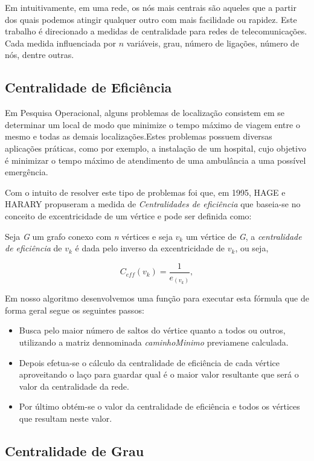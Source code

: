 \documentclass[12pt]{article}
\begin{document}
Em \cite{freitas} intuitivamente, em uma rede, os nós mais centrais são aqueles que a partir dos quais podemos atingir qualquer outro com mais facilidade ou rapidez.
Este trabalho é direcionado a medidas de centralidade para redes de telecomunicações.
Cada medida influenciada por $n$ variáveis, grau, número de ligações, número de nós, dentre outras.

\subsection{Centralidade de Eficiência}
Em  Pesquisa  Operacional,  alguns  problemas  de  localização  consistem  em  se determinar um local de modo que minimize o tempo máximo de viagem entre o mesmo e todas as demais localizações.Estes problemas possuem diversas aplicações práticas, como  por  exemplo,  a  instalação  de  um  hospital,  cujo objetivo  é  minimizar  o  tempo máximo de atendimento de uma ambulância a uma possível emergência\cite{freitas}.

Com o intuito de resolver este tipo de problemas foi que, em 1995,  HAGE e HARARY propuseram a medida de {\it Centralidades de eficiência} que baseia-se no conceito de excentricidade de um vértice e pode ser definida como: 

    Seja  {\it G} um grafo conexo com {\it n} vértices  e seja $v_k$ um vértice de {\it G}, a {\it centralidade de eficiência} de $v_k$ é dada pelo inverso da excentricidade de $v_k$, ou seja,
\begin{center}
\begin{equation}
C_{eff}(v_k)= \frac{1}{e_{(v_k)}},
\end{equation}
\end{center}
    Em nosso algoritmo desenvolvemos uma função para executar esta fórmula que de forma geral segue os seguintes passos:
\begin{itemize}
\item Busca pelo maior número de saltos do vértice quanto a todos ou outros, utilizando a matriz dennominada {\it caminhoMinimo} previamene calculada.
\item Depois efetua-se o cálculo da centralidade de eficiência de cada vértice aproveitando o laço para guardar qual é o maior valor resultante que será o valor da centralidade da rede.
\item Por último obtém-se o valor da centralidade de eficiência e todos os vértices que resultam neste valor. 
\end{itemize}    
\subsection{Centralidade de Grau}
\end{document}
